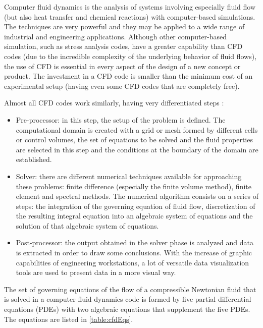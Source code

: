 Computer fluid dynamics is the analysis of systems involving especially fluid flow (but also heat transfer and chemical reactions) with computer-based simulations. The techniques are very powerful and they may be applied to a wide range of industrial and engineering applications. Although other computer-based simulation, such as stress analysis codes, have a greater capability than CFD codes (due to the incredible complexity of the underlying behavior of fluid flows), the use of CFD is essential in every aspect of the design of a new concept or product. The investment in a CFD code is smaller than the minimum cost of an experimental setup (having even some CFD codes that are completely free). 

Almost all CFD codes work similarly, having very differentiated steps \cite{versteeg1995computational}:
\begin{itemize}
    \item Pre-processor: in this step, the setup of the problem is defined. The computational domain is created with a grid or mesh formed by different cells or control volumes, the set of equations to be solved and the fluid properties are selected in this step and the conditions at the boundary of the domain are established. 
    \item Solver: there are different numerical techniques available for approaching these problems: finite difference (especially the finite volume method), finite element and spectral methods. The numerical algorithm consists on a series of steps: the integration of the governing equation of fluid flow, discretization of the resulting integral equation into an algebraic system of equations and the solution of that algebraic system of equations. 
    \item Post-processor: the output obtained in the solver phase is analyzed and data is extracted in order to draw some conclusions. With the increase of graphic capabilities of engineering workstations, a lot of versatile data visualization tools are used to present data in a more visual way. 
\end{itemize}

The set of governing equations of the flow of a compressible Newtonian fluid that is solved in a computer fluid dynamics code is formed by five partial differential equations (PDEs) with two algebraic equations that supplement the five PDEs. The equations are listed in
\ref{table:cfdEqs}.

\newpage

